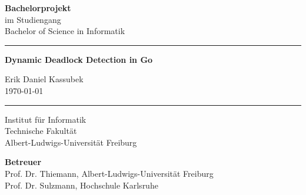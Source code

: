 \begin{titlepage}
\begin{center}
  $ $
  \vspace{1.5cm}

  {\huge \textbf{Bachelorprojekt}}\\
  \vspace{1cm}
  {\Large im Studiengang}\\
  {\Large Bachelor of Science in Informatik}

  \vspace{2.5cm}

  \hrule
  
  \vspace{1cm}

  {\Huge \textbf{Dynamic Deadlock Detection in Go}}
  
  \vspace{2cm}

  {\LARGE Erik Daniel Kassubek}\\
  \vspace{1cm}
  {\Large \today}

  \vspace{1cm}
  \hrule

  \vspace{5cm}

  {\Large Institut für Informatik}\\
  {\Large Technische Fakultät}\\
  {\Large Albert-Ludwigs-Universität Freiburg}
  
  \vspace{3cm}

  {\Large\textbf{Betreuer}}\\
  {\Large Prof. Dr. Thiemann, Albert-Ludwigs-Universität Freiburg}\\
  {\Large Prof. Dr. Sulzmann, Hochschule Karlsruhe}
  \vspace{2cm}\vspace{-3cm}
\end{center}


\end{titlepage}
